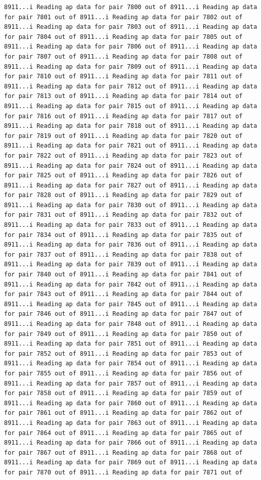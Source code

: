 \documentclass[
]{article}
\begin{document}
\begin{verbatim}
8911...i Reading ap data for pair 7800 out of 8911...i Reading ap data for pair 7801 out of 8911...i Reading ap data for pair 7802 out of 8911...i Reading ap data for pair 7803 out of 8911...i Reading ap data for pair 7804 out of 8911...i Reading ap data for pair 7805 out of 8911...i Reading ap data for pair 7806 out of 8911...i Reading ap data for pair 7807 out of 8911...i Reading ap data for pair 7808 out of 8911...i Reading ap data for pair 7809 out of 8911...i Reading ap data for pair 7810 out of 8911...i Reading ap data for pair 7811 out of 8911...i Reading ap data for pair 7812 out of 8911...i Reading ap data for pair 7813 out of 8911...i Reading ap data for pair 7814 out of 8911...i Reading ap data for pair 7815 out of 8911...i Reading ap data for pair 7816 out of 8911...i Reading ap data for pair 7817 out of 8911...i Reading ap data for pair 7818 out of 8911...i Reading ap data for pair 7819 out of 8911...i Reading ap data for pair 7820 out of 8911...i Reading ap data for pair 7821 out of 8911...i Reading ap data for pair 7822 out of 8911...i Reading ap data for pair 7823 out of 8911...i Reading ap data for pair 7824 out of 8911...i Reading ap data for pair 7825 out of 8911...i Reading ap data for pair 7826 out of 8911...i Reading ap data for pair 7827 out of 8911...i Reading ap data for pair 7828 out of 8911...i Reading ap data for pair 7829 out of 8911...i Reading ap data for pair 7830 out of 8911...i Reading ap data for pair 7831 out of 8911...i Reading ap data for pair 7832 out of 8911...i Reading ap data for pair 7833 out of 8911...i Reading ap data for pair 7834 out of 8911...i Reading ap data for pair 7835 out of 8911...i Reading ap data for pair 7836 out of 8911...i Reading ap data for pair 7837 out of 8911...i Reading ap data for pair 7838 out of 8911...i Reading ap data for pair 7839 out of 8911...i Reading ap data for pair 7840 out of 8911...i Reading ap data for pair 7841 out of 8911...i Reading ap data for pair 7842 out of 8911...i Reading ap data for pair 7843 out of 8911...i Reading ap data for pair 7844 out of 8911...i Reading ap data for pair 7845 out of 8911...i Reading ap data for pair 7846 out of 8911...i Reading ap data for pair 7847 out of 8911...i Reading ap data for pair 7848 out of 8911...i Reading ap data for pair 7849 out of 8911...i Reading ap data for pair 7850 out of 8911...i Reading ap data for pair 7851 out of 8911...i Reading ap data for pair 7852 out of 8911...i Reading ap data for pair 7853 out of 8911...i Reading ap data for pair 7854 out of 8911...i Reading ap data for pair 7855 out of 8911...i Reading ap data for pair 7856 out of 8911...i Reading ap data for pair 7857 out of 8911...i Reading ap data for pair 7858 out of 8911...i Reading ap data for pair 7859 out of 8911...i Reading ap data for pair 7860 out of 8911...i Reading ap data for pair 7861 out of 8911...i Reading ap data for pair 7862 out of 8911...i Reading ap data for pair 7863 out of 8911...i Reading ap data for pair 7864 out of 8911...i Reading ap data for pair 7865 out of 8911...i Reading ap data for pair 7866 out of 8911...i Reading ap data for pair 7867 out of 8911...i Reading ap data for pair 7868 out of 8911...i Reading ap data for pair 7869 out of 8911...i Reading ap data for pair 7870 out of 8911...i Reading ap data for pair 7871 out of 
\end{verbatim}
\end{document}
